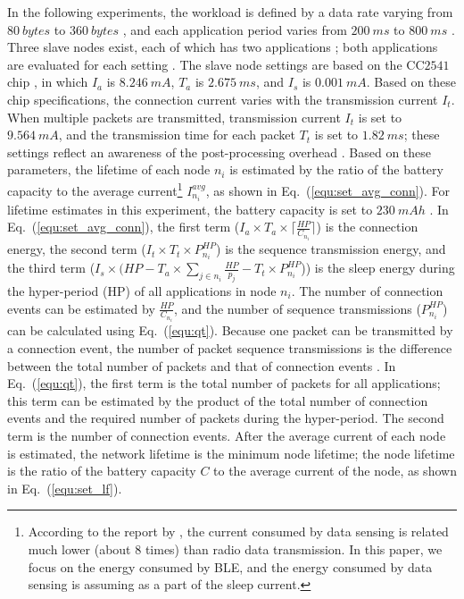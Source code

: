 \documentclass[10pt,journal,compsoc]{IEEEtran}
\begin{document}
In the following experiments, the workload is defined by a data rate varying from $80~bytes$ to $360~bytes$ \cite{kindt2015adaptive}, and each application period varies from $200~ms$ to $800~ms$ \cite{tang2015deadline, aquino2008wireless}. Three slave nodes exist, each of which has two applications \cite{fernandes2015wireless}; both applications are evaluated for each setting \cite{USG_CC2540, giovanelli2015bluetooth}.
The slave node settings are based on the CC$2541$ chip \cite{MEASURE_BLE}, in which $I_{a}$ is $8.246~mA$, $T_{a}$ is $2.675~ms$, and $I_s$ is $0.001~mA$. Based on these chip specifications, the connection current varies with the transmission current $I_t$.
When multiple packets are transmitted, transmission current $I_t$ is set to $9.564~mA$, and the transmission time for each packet $T_t$ is set to $1.82~ms$; these settings reflect an awareness of the post-processing overhead \cite{giovanelli2015bluetooth}.
Based on these parameters, the lifetime of each node $n_i$ is estimated by the ratio of the battery capacity to the average current\footnote{According to the report by \cite{phuong2015real}, the current consumed by data sensing is related much lower (about $8$ times) than radio data transmission. In this paper, we focus on the energy consumed by BLE, and the energy consumed by data sensing is assuming as a part of the sleep current.} $I^{avg}_{n_i}$, as shown in Eq.~(\ref{equ:set_avg_conn}). For lifetime estimates in this experiment, the battery capacity is set to $230~mAh$ \cite{hoflinger2014smartphone}.
In Eq.~(\ref{equ:set_avg_conn}), the first term ($I_{a} \times T_{a} \times \lceil\frac{HP}{C_{n_i}}\rceil$) is the connection energy, the second term ($I_t \times T_t \times P^{HP}_{n_i}$) is the sequence transmission energy, and the third term ($I_{s} \times (HP- T_{a} \times \sum_{j \in {n_i}} \frac{HP}{p_j} - T_t \times P^{HP}_{n_i}$)) is the sleep energy during the hyper-period (HP) of all applications in node $n_i$. The number of connection events can be estimated by $\frac{HP}{C_{n_i}}$, and the number of sequence transmissions ($P^{HP}_{n_i}$) can be calculated using Eq.~(\ref{equ:qt}). Because one packet can be transmitted by a connection event, the number of packet sequence transmissions is the difference between the total number of packets and that of connection events \cite{giovanelli2015bluetooth}. In Eq.~(\ref{equ:qt}), the first term is the total number of packets for all applications; this term can be estimated by the product of the total number of connection events and the required number of packets during the hyper-period. The second term is the number of connection events. After the average current of each node is estimated, the network lifetime is the minimum node lifetime; the node lifetime is the ratio of the battery capacity $C$ to the average current of the node, as shown in Eq.~(\ref{equ:set_lf}).
\end{document}
